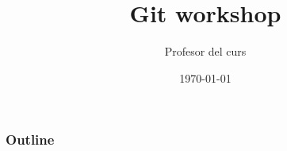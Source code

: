 \documentclass{beamer}
\title[Git Workshop]{Git workshop}
\author{Profesor del curs}
\institute[LinuxUPC]
{
	LinuxUPC \\
	\textit{linuxupc at linuxupc.upc.edu}
}
\date{\today}
\begin{document}
\begin{frame}
	\titlepage
\end{frame}

\begin{frame}
	\frametitle{Outline}
	\tableofcontents
\end{frame}




\end{document}

